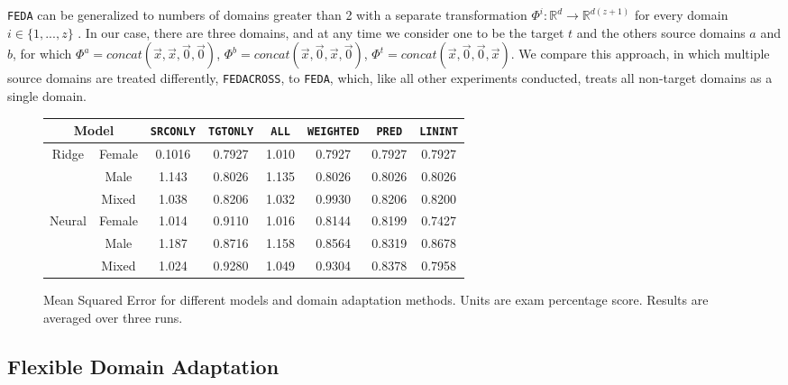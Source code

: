 \documentclass{article}
\begin{document}
\texttt{FEDA} can be generalized to numbers of domains greater than 2 with a separate transformation \(\Phi^i : \mathbb{R}^{d} \rightarrow \mathbb{R}^{d(z + 1)}\) for every domain \(i \in \{1, ..., z\}\) \citep{daume}. In our case, there are three domains, and at any time we consider one to be the target \(t\) and the others source domains \(a\) and \(b\), for which \(\Phi^a = concat(\vec{x}, \vec{x}, \vec{0}, \vec{0})\), \(\Phi^b = concat(\vec{x}, \vec{0}, \vec{x}, \vec{0})\), \(\Phi^t = concat(\vec{x}, \vec{0}, \vec{0}, \vec{x})\). We compare this approach, in which multiple source domains are treated differently, \texttt{FEDACROSS}, to \texttt{FEDA}, which, like all other experiments conducted, treats all non-target domains as a single domain.

\begin{figure}[h]
\label{baselines}
\centering{}
\begin{center}
\begin{tabular}{ |c|c||c|c|c|c|c|c| }
 \hline
 \multicolumn{2}{|c|}{Model} & \texttt{SRCONLY} & \texttt{TGTONLY} & \texttt{ALL} & \texttt{WEIGHTED} & \texttt{PRED} & \texttt{LININT} \\ 
 \hline
 \hline
 \multirow{3}{*}{Ridge} & Female & 0.1016 & 0.7927 & 1.010 & 0.7927 & 0.7927 & 0.7927 \\  
 \cline{2-8}
       & Male                    & 1.143 & 0.8026 & 1.135 & 0.8026 & 0.8026 & 0.8026 \\
 \cline{2-8}
       & Mixed                    & 1.038      & 0.8206 & 1.032 & 0.9930 & 0.8206 & 0.8200 \\
 \hline
 \multirow{3}{*}{Neural} & Female & 1.014 & 0.9110 & 1.016 & 0.8144 & 0.8199 & 0.7427 \\
 \cline{2-8}
       & Male & 1.187 & 0.8716 & 1.158 & 0.8564 & 0.8319 & 0.8678 \\
 \cline{2-8}
       & Mixed                    & 1.024 & 0.9280 & 1.049 & 0.9304 & 0.8378 & 0.7958 \\
 \hline
\end{tabular}
\end{center}
\caption{Mean Squared Error for different models and domain adaptation methods. Units are exam percentage score. Results are averaged over three runs.}
\end{figure}

\subsection{Flexible Domain Adaptation}
\end{document}
